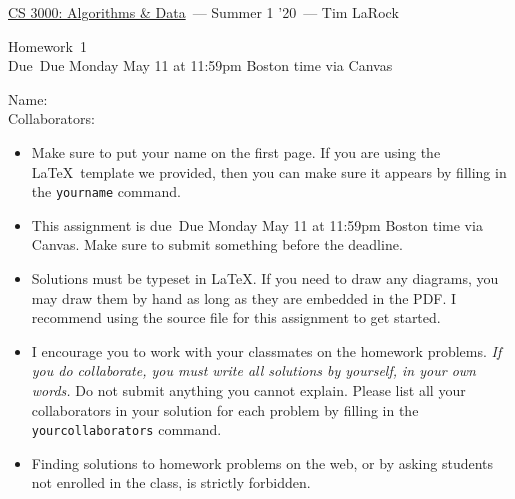\documentclass[11pt]{article}
\newcommand{\yourname}{}
\newcommand{\yourcollaborators}{}
\theoremstyle{definition}
\theoremstyle{theorem}
\newcommand{\course}{\href{https://tlarock.github.io/teaching/cs3000/syllabus.html}{CS 3000: Algorithms \& Data}}
\newcommand{\instructor}{Tim LaRock}
\newcommand{\semester}{Summer 1 '20}
\newcommand{\hwnum}{1}
\newcommand{\hwdue}{Due Monday May 11 at 11:59pm Boston time via Canvas}
\begin{document}
{\Large 
\begin{center} \course\ --- \semester\ --- \instructor \end{center}}
{\large
\vspace{10pt}
\noindent Homework~\hwnum \vspace{2pt}\\
Due~\hwdue}

\bigskip
{\large
\noindent Name: \yourname \vspace{2pt}\\ Collaborators: \yourcollaborators}

\vspace{15pt}
\begin{itemize}

\item Make sure to put your name on the first page.  If you are using the \LaTeX~template we provided, then you can make sure it appears by filling in the \texttt{yourname} command.

\item This assignment is due~\hwdue.  Make sure to submit something before the deadline.

\item Solutions must be typeset in \LaTeX.  If you need to draw any diagrams, you may draw them by hand as long as they are embedded in the PDF.  I recommend using the source file for this assignment to get started.

\item I encourage you to work with your classmates on the homework problems. \emph{If you do collaborate, you must write all solutions by yourself, in your own words.}  Do not submit anything you cannot explain.  Please list all your collaborators in your solution for each problem by filling in the \texttt{yourcollaborators} command.

\item Finding solutions to homework problems on the web, or by asking students not enrolled in the class, is strictly forbidden.


\end{itemize}
\end{document}
